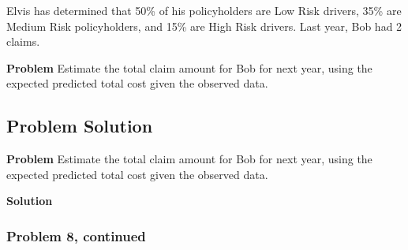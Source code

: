 \documentclass[12pt]{article}
\theoremstyle{definition}
\begin{document}
Elvis has determined that 50\% of his policyholders are Low Risk drivers, 35\% are Medium Risk policyholders, and 15\% are High Risk drivers. Last year, Bob had 2 claims.

\bigskip
\noindent
{\bf Problem} Estimate the total claim amount for Bob for next year, using the expected predicted total cost given the observed data.

\subsection*{Problem Solution}

\noindent
{\bf Problem} Estimate the total claim amount for Bob for next year, using the expected predicted total cost given the observed data.

\bigskip
\noindent
{\bf Solution}


\newpage
\subsubsection*{Problem 8, continued}
\end{document}

